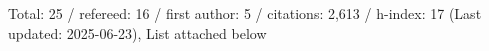 Total: 25 / refereed: 16 / first author: 5 / citations: 2,613 / h-index: 17 (Last updated: 2025-06-23), List attached below